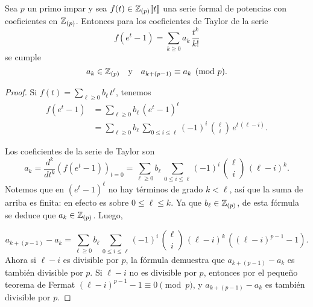 \documentclass{article}
\numberwithin{equation}{section}
\theoremstyle{definition}
\begin{document}
\begin{lema}
  Sea $p$ un primo impar y sea $f (t) \in \mathbb{Z}_{(p)} [\![t]\!]$ una serie formal
  de potencias con coeficientes en $\mathbb{Z}_{(p)}$. Entonces para los coeficientes
  de Taylor de la serie
  $$f (e^t - 1) = \sum_{k \ge 0} a_k \, \frac{t^k}{k!}$$
  se cumple
  $$a_k \in \mathbb{Z}_{(p)} \quad \text{y}\quad a_{k + (p-1)} \equiv a_k \pmod{p}.$$

  \begin{proof}
    Si $f (t) = \sum_{\ell \ge 0} b_\ell\,t^\ell$, tenemos
    \begin{align*}
      f (e^t - 1) & = \sum_{\ell \ge 0} b_\ell \, (e^t - 1)^\ell \\
                  & = \sum_{\ell \ge 0} b_\ell \, \sum_{0 \le i \le \ell} (-1)^i \, {\ell \choose i} \, e^{t \, (\ell-i)}.
    \end{align*}

    Los coeficientes de la serie de Taylor son
    \[ a_k = \frac{d^k}{dt^k} \left(f (e^t - 1)\right)_{t = 0} =
      \sum_{\ell \ge 0} b_\ell \, \sum_{0 \le i \le \ell} (-1)^i \, {\ell \choose i} \, (\ell-i)^k. \]
    Notemos que en $(e^t - 1)^\ell$ no hay términos de grado $k < \ell$, así que
    la suma de arriba es finita: en efecto es sobre $0 \le \ell \le k$. Ya que
    $b_\ell \in \mathbb{Z}_{(p)}$, de esta fórmula se deduce que $a_k \in
    \mathbb{Z}_{(p)}$. Luego,

    $$a_{k + (p-1)} - a_k =
    \sum_{\ell \ge 0} b_\ell \, \sum_{0 \le i \le \ell} (-1)^i \, {\ell \choose i} \, (\ell-i)^k\,\left((\ell-i)^{p-1} - 1\right).$$
    Ahora si $\ell - i$ es divisible por $p$, la fórmula demuestra que
    $a_{k + (p-1)} - a_k$ es también divisible por $p$. Si $\ell - i$ no es
    divisible por $p$, entonces por el pequeño teorema de Fermat
    $(\ell-i)^{p-1} - 1 \equiv 0 \pmod{p}$, y $a_{k + (p-1)} - a_k$ es también
    divisible por $p$.
  \end{proof}
\end{lema}
\end{document}
